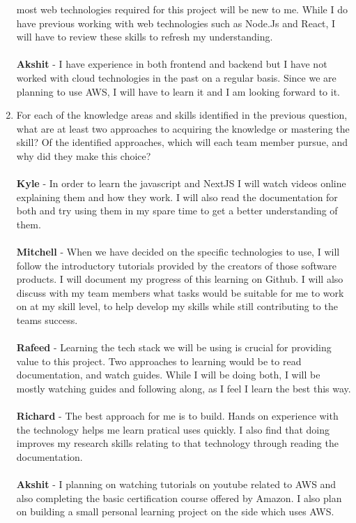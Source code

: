 \documentclass[12pt]{article}
\begin{document}
\begin{enumerate}
      most web technologies required for this project will be new to me. While I
      do have previous working with web technologies such as Node.Js and React,
      I will have to review these skills to refresh my understanding.\\
      \\
      \textbf{Akshit} - I have experience in both frontend and backend
      but I have not worked
      with cloud technologies in the past on a regular basis. Since we
      are planning to use AWS,
      I will have to learn it and I am looking forward to it. \\
    \item For each of the knowledge areas and skills identified in the previous
      question, what are at least two approaches to acquiring the knowledge or
      mastering the skill?  Of the identified approaches, which will each team
      member pursue, and why did they make this choice? \\
      \\
      \textbf{Kyle} - In order to learn the javascript and NextJS I
      will watch videos online explaining them and how they work. I
      will also read the documentation for both and try using them in
      my spare time to get a better understanding of them.\\
      \\
      \textbf{Mitchell} - When we have decided on the specific
      technologies to use, I will follow the introductory tutorials
      provided by the creators of those software products. I will
      document my progress of this learning on Github. I will also
      discuss with my team members what tasks would be suitable for me
      to work on at my skill level, to help develop my skills while
      still contributing to the teams success. \\
      \\
      \textbf{Rafeed} - Learning the tech stack we will be using is
      crucial for providing value to this project. Two approaches to
      learning would be to read documentation, and watch guides. While
      I will be doing both, I will be mostly watching guides and
      following along, as I feel I learn the best this way. \\
      \\
      \textbf{Richard} - The best approach for me is to build. Hands
      on experience
      with the technology helps me learn pratical uses quickly. I also find that
      doing improves my research skills relating to that technology
      through reading
      the documentation.\\
      \\
      \textbf{Akshit} - I planning on watching tutorials on youtube
      related to AWS
      and also completing the basic certification course offered by
      Amazon. I also plan on building a
      small personal learning project on the side which uses AWS.\\
  \end{enumerate}

  \newpage

  
  
  \nocite{*}

  
\end{document}
